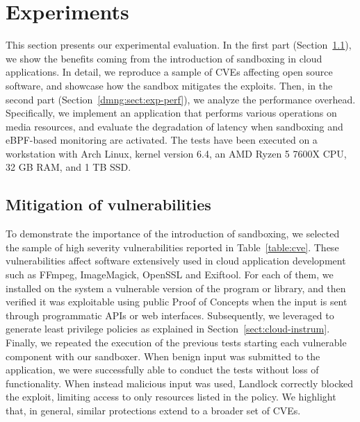 \section{Experiments}\label{dmng:sect:exp}

This section presents our experimental evaluation. In the first part
(Section~\ref{dmng:sect:exp-mitig}), we show the benefits coming from the
introduction of sandboxing in cloud applications. In detail, we
reproduce a sample of CVEs affecting open source software, and
showcase how the sandbox mitigates the exploits. Then, in the second part
(Section~\ref{dmng:sect:exp-perf}), we analyze the performance
overhead. Specifically, we implement an application that performs
various operations on media resources, and evaluate the
degradation of latency when sandboxing and eBPF-based monitoring are
activated. The tests have been executed on a workstation with Arch
Linux, kernel version 6.4, an AMD Ryzen 5 7600X CPU, 32 GB RAM, and 1
TB SSD.

\subsection{Mitigation of vulnerabilities}\label{dmng:sect:exp-mitig}

To demonstrate the importance of the introduction of sandboxing, we
selected the sample of high severity vulnerabilities reported in
Table~\ref{table:cve}. These vulnerabilities affect software
extensively used in cloud application development such as FFmpeg,
ImageMagick, OpenSSL and Exiftool. For each of them, we installed on
the system a vulnerable version of the program or library, and then
verified it was exploitable using public Proof of Concepts when the
input is sent through programmatic APIs or web
interfaces. Subsequently, we leveraged \dmng to generate least
privilege policies as explained in
Section~\ref{sect:cloud-instrum}. Finally, we repeated the execution
of the previous tests starting each vulnerable component with our
sandboxer. When benign input was submitted to the application, we were
successfully able to conduct the tests without loss of
functionality. When instead malicious input was used, Landlock
correctly blocked the exploit, limiting access to only resources
listed in the policy. We highlight that, in general, similar
protections extend to a broader set of CVEs.


